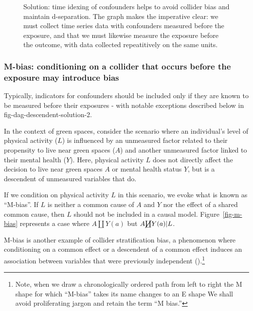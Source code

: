 \documentclass[
  singlecolumn]{article}
\begin{document}
\begin{figure}


\caption{\label{fig-dag-common-effect-solution}Solution: time idexing of
confounders helps to avoid collider bias and maintain d-separation. The
graph makes the imperative clear: we must collect time series data with
confounders measured before the exposure, and that we must likewise
measure the exposure before the outcome, with data collected
repeatitively on the same units.}

\end{figure}%

\subsubsection{M-bias: conditioning on a collider that occurs before the
exposure may introduce
bias}\label{m-bias-conditioning-on-a-collider-that-occurs-before-the-exposure-may-introduce-bias}

Typically, indicators for confounders should be included only if they
are known to be measured before their exposures - with notable
exceptions described below in fig-dag-descendent-solution-2.

In the context of green spaces, consider the scenario where an
individual's level of physical activity (\(L\)) is influenced by an
unmeasured factor related to their propensity to live near green spaces
(\(A\)) and another unmeasured factor linked to their mental health
(\(Y\)). Here, physical activity \(L\) does not directly affect the
decision to live near green spaces \(A\) or mental health status \(Y\),
but is a descendent of unmeasured variables that do.

If we condition on physical activity \(L\) in this scenario, we evoke
what is known as ``M-bias''. If \(L\) is neither a common cause of \(A\)
and \(Y\) nor the effect of a shared common cause, then \(L\) should not
be included in a causal model. Figure~\ref{fig-m-bias} represents a case
where \(A \coprod Y(a)\) but \(A \cancel{\coprod} Y(a)| L\).

M-bias is another example of collider stratification bias, a phenomenon
where conditioning on a common effect or a descendent of a common effect
induces an association between variables that were previously
independent ().\footnote{Note, when we draw a chronologically ordered path from
  left to right the M shape for which ``M-bias'' takes its name changes
  to an E shape We shall avoid proliferating jargon and retain the term
  ``M bias.''}
\end{document}
